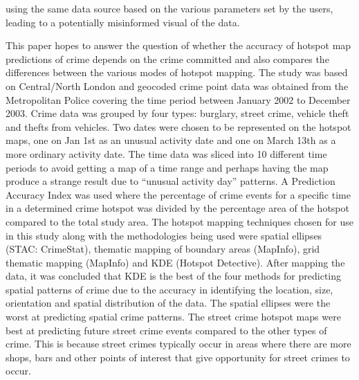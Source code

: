\documentclass[10pt,letterpaper,english]{article}
\begin{document}
using the same data source based on the various parameters set by the users, leading to a potentially misinformed visual of the data.

This paper hopes to answer the question of whether the accuracy of hotspot map predictions of crime depends on the crime committed and also compares the differences between the various modes of hotspot mapping. The study was based on Central/North London and geocoded crime point data was obtained from the Metropolitan Police covering the time period between January 2002 to December 2003. Crime data was grouped by four types: burglary, street crime, vehicle theft and thefts from vehicles. Two dates were chosen to be represented on the hotspot maps, one on Jan 1st as an unusual activity date and one on March 13th as a more ordinary activity date. The time data was sliced into 10 different time periods to avoid getting a map of a time range and perhaps having the map produce a strange result due to “unusual activity day” patterns. A Prediction Accuracy Index was used where the percentage of crime events for a specific time in a determined crime hotspot was divided by the percentage area of the hotspot compared to the total study area. The hotspot mapping techniques chosen for use in this study along with the methodologies being used were spatial ellipses (STAC: CrimeStat), thematic mapping of boundary areas (MapInfo), grid thematic mapping (MapInfo) and KDE (Hotspot Detective). After mapping the data, it was concluded that KDE is the best of the four methods for predicting spatial patterns of crime due to the accuracy in identifying the location, size, orientation and spatial distribution of the data. The spatial ellipses were the worst at predicting spatial crime patterns. The street crime hotspot maps were best at predicting future street crime events compared to the other types of crime. This is because street crimes typically occur in areas where there are more shops, bars and other points of interest that give opportunity for street crimes to occur. 
\end{document}
